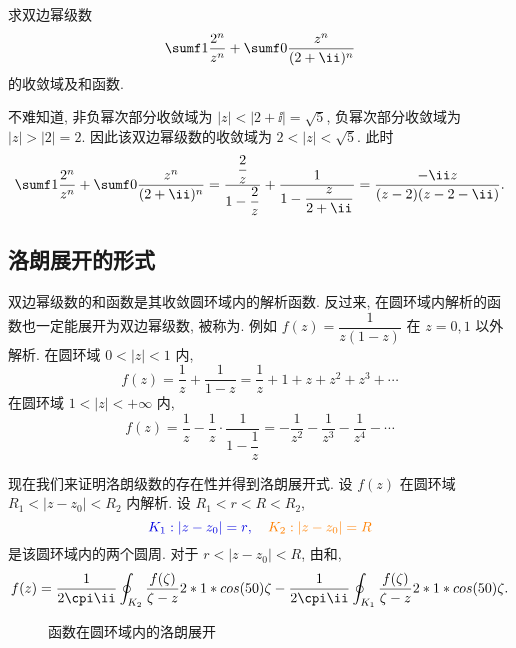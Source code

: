 \begin{example}
  求双边幂级数
  \[
    \sumf1 \frac{2^n}{z^n}+\sumf0 \frac{z^n}{(2+\ii)^n}
  \]
  的收敛域及和函数.
\end{example}

\begin{solution}
  不难知道, 非负幂次部分收敛域为 $|z|<|2+\ii|=\sqrt5$, 负幂次部分收敛域为 $|z|>|2|=2$. 
  因此该双边幂级数的收敛域为 $2<|z|<\sqrt5$.
  此时
  \[
     \sumf1 \frac{2^n}{z^n}+\sumf0 \frac{z^n}{(2+\ii)^n}
    =\frac{\dfrac2z}{1-\dfrac2z}+\frac1{1-\dfrac z{2+\ii}}
    =\frac{-\ii z}{(z-2)(z-2-\ii)}.
  \]
\end{solution}


\subsection{洛朗展开的形式}

双边幂级数的和函数是其收敛圆环域内的解析函数.
反过来, 在圆环域内解析的函数也一定能展开为双边幂级数, 被称为.
例如 $f(z)=\dfrac1{z(1-z)}$ 在 $z=0,1$ 以外解析.
在圆环域 $0<|z|<1$ 内,
\[f(z)=\frac1z+\frac1{1-z}=\frac1z+1+z+z^2+z^3+\cdots\]
在圆环域 $1<|z|<+\infty$ 内,
\[f(z)=\frac1z-\frac1z\cdot\frac1{1-\dfrac1z}=-\frac1{z^2}-\frac1{z^3}-\frac1{z^4}-\cdots\]

现在我们来证明洛朗级数的存在性并得到洛朗展开式.
设 $f(z)$ 在圆环域 $R_1<|z-z_0|<R_2$ 内解析.
设 $R_1<r<R<R_2$, 
\[
  \color{main}{K_1:|z-z_0|=r},\quad \color{fifth}{K_2:|z-z_0|=R}
\]
是该圆环域内的两个圆周.
对于 $r<|z-z_0|<R$, 由\thmCCC 和\thmCIH,
\[
   f(z)
  =\frac1{2\cpi\ii}\oint_{K_2}\frac{f(\zeta)}{\zeta-z}\d\zeta
  -\frac1{2\cpi\ii}\oint_{K_1}\frac{f(\zeta)}{\zeta-z}\d\zeta.
\]

\begin{figure}[!htb]
  \centering
  \caption{函数在圆环域内的洛朗展开}
\end{figure}

